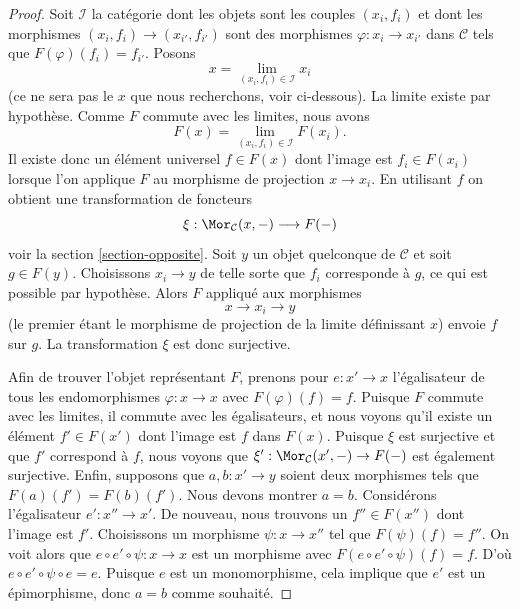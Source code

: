 \begin{proof}
Soit $\mathcal{I}$ la catégorie dont les objets sont les couples $(x_i, f_i)$
et dont les morphismes $(x_i, f_i) \to (x_{i'}, f_{i'})$ sont des morphismes
$\varphi : x_i \to x_{i'}$ dans $\mathcal{C}$ tels que $F(\varphi)(f_i) = f_{i'}$. Posons
$$
x = \lim_{(x_i, f_i) \in \mathcal{I}} x_i
$$
(ce ne sera pas le $x$ que nous recherchons, voir ci-dessous). La limite
existe par hypothèse. Comme $F$ commute avec les limites, nous avons
$$
F(x) = \lim_{(x_i, f_i) \in \mathcal{I}} F(x_i).
$$
Il existe donc un élément universel $f \in F(x)$ dont l'image est
$f_i \in F(x_i)$ lorsque l'on applique $F$ au morphisme de projection
$x \to x_i$. En
utilisant $f$ on obtient une transformation de foncteurs
$$
\xi : \Mor_\mathcal{C}(x, - ) \longrightarrow F(-)
$$
voir la section \ref{section-opposite}. Soit $y$ un objet quelconque de
$\mathcal{C}$ et soit $g \in F(y)$. Choisissons $x_i \to y$ de telle sorte que
$f_i$ corresponde à $g$, ce qui est possible par hypothèse. Alors $F$ appliqué
aux morphismes
$$
x \longrightarrow x_i \longrightarrow y
$$
(le premier étant le morphisme de projection de la limite définissant $x$)
envoie $f$ sur $g$. La transformation $\xi$ est donc surjective.

\medskip\noindent
Afin de trouver l'objet représentant $F$, prenons pour $e : x' \to x$
l'égalisateur de tous les endomorphismes $\varphi : x \to x$ avec
$F(\varphi)(f) = f$. Puisque $F$ commute avec les limites, il commute avec les
égalisateurs, et nous voyons qu'il existe un élément $f' \in F(x')$ dont l'image
est $f$ dans $F(x)$. Puisque $\xi$ est surjective et que $f'$
correspond à $f$, nous voyons que $\xi' : \Mor_\mathcal{C}(x', -) \to F(-)$
est également surjective. Enfin, supposons que $a, b : x' \to y$ soient deux
morphismes tels que $F(a)(f') = F(b)(f')$. Nous devons montrer $a = b$.
Considérons l'égalisateur $e' : x'' \to x'$. De nouveau, nous trouvons un
$f'' \in F(x'')$ dont l'image est $f'$. Choisissons un morphisme $\psi : x \to x''$ tel que $F(\psi)(f) = f''$. On voit alors que $e \circ e' \circ \psi : x \to x$ est un morphisme avec $F(e \circ e' \circ \psi)(f) = f$. D'où $e \circ e' \circ \psi \circ e = e$. Puisque $e$ est un monomorphisme, cela
implique que $e'$ est un épimorphisme, donc $a = b$ comme souhaité.
\end{proof}

